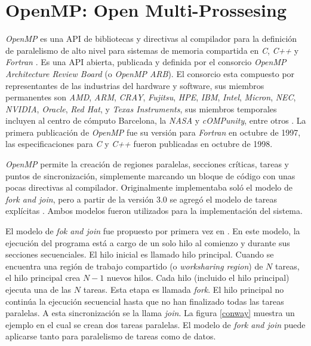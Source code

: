 
\section{OpenMP: Open Multi-Prossesing}

\label{mt_openmp}

\emph{OpenMP} es una API de bibliotecas y directivas al compilador para la
definición de paralelismo de alto nivel para sistemas de memoria compartida en
\emph{C}, \emph{C++} y \emph{Fortran} \cite{ompWeb}. Es una API abierta,
publicada y definida por el consorcio \emph{OpenMP Architecture Review Board}
(o \emph{OpenMP ARB}). El consorcio esta compuesto por representantes de las
industrias del hardware y software, sus miembros permanentes son \emph{AMD},
\emph{ARM}, \emph{CRAY}, \emph{Fujitsu}, \emph{HPE}, \emph{IBM}, \emph{Intel},
\emph{Micron}, \emph{NEC}, \emph{NVIDIA}, \emph{Oracle}, \emph{Red Hat}, y
\emph{Texas Instruments}, sus miembros temporales incluyen al centro de
cómputo Barcelona, la \emph{NASA} y \emph{cOMPunity}, entre otros
\cite{ompWeb}. La primera publicación de \emph{OpenMP} fue su versión para
\emph{Fortran} en octubre de 1997, las especificaciones para \emph{C} y
\emph{C++} fueron publicadas en octubre de 1998.

\emph{OpenMP} permite la creación de regiones paralelas, secciones críticas,
tareas y puntos de sincronización, simplemente marcando un bloque de código
con unas pocas directivas al compilador. Originalmente implementaba soló el
modelo de \emph{fork and join}, pero a partir de la versión 3.0 se agregó el
modelo de tareas explícitas \cite{openmp08}. Ambos modelos fueron utilizados
para la implementación del sistema.

El modelo de \emph{fok and join} fue propuesto por primera vez en
\cite{conway1963}. En este modelo, la ejecución del programa está a cargo de un
solo hilo al comienzo y durante sus secciones secuenciales. El hilo inicial es
llamado hilo principal. Cuando se encuentra una región de trabajo compartido (o
\emph{worksharing region}) de $N$ tareas, el hilo principal crea $N-1$ nuevos
hilos. Cada hilo (incluido el hilo principal) ejecuta una de las $N$ tareas.
Esta etapa es llamada \emph{fork}. El hilo principal no continúa la ejecución
secuencial hasta que no han finalizado todas las tareas paralelas. A esta
sincronización se la llama \emph{join}. La figura \ref{conway} muestra un
ejemplo en el cual se crean dos tareas paralelas. El modelo de \emph{fork and
join} puede aplicarse tanto para paralelismo de tareas como de datos.


